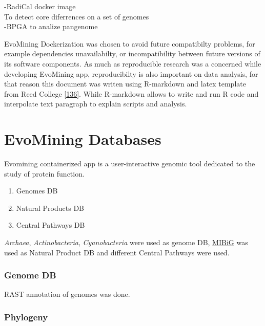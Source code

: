 \documentclass[12pt,twoside]{reedthesis}
\providecommand{\tightlist}{%
  \setlength{\itemsep}{0pt}\setlength{\parskip}{0pt}}
\begin{document}
  -RadiCal docker image\\
  To detect core diferrences on a set of genomes\\
  -BPGA to analize pangenome
  
  EvoMining Dockerization was chosen to avoid future compatibilty
  problems, for example dependencies unavailabilty, or incompatibility
  between future versions of its software components. As much as
  reproducible research was a concerned while developing EvoMining app,
  reproducibilty is also important on data analysis, for that reason this
  document was writen using R-markdown and latex template from Reed
  College
  {[}\protect\hyperlink{ref-chesterismayux5fupdatedux5f2016}{136}{]}.
  While R-markdown allows to write and run R code and interpolate text
  paragraph to explain scripts and analysis.
  
  \section{EvoMining Databases}\label{evomining-databases}
  
  Evomining containerized app is a user-interactive genomic tool dedicated
  to the study of protein function\protect\hyperlink{section}{}.
  
  \begin{enumerate}
  \def\labelenumi{\arabic{enumi}.}
  \tightlist
  \item
    Genomes DB
  \item
    Natural Products DB
  \item
    Central Pathways DB
  \end{enumerate}
  
  \emph{Archaea}, \emph{Actinobacteria}, \emph{Cyanobacteria} were used as
  genome DB, \href{http://mibig.secondarymetabolites.org/}{MIBiG} was used
  as Natural Product DB and different Central Pathways were used.
  
  \subsubsection{Genome DB}\label{genome-db}
  
  RAST annotation of genomes was done.
  
  \subsubsection{Phylogeny}\label{phylogeny}
  
\end{document}
